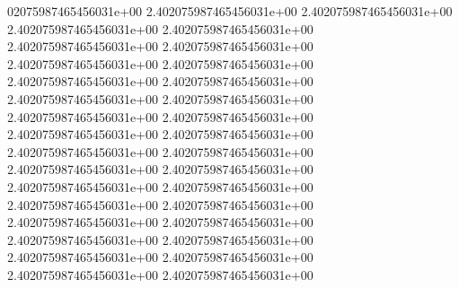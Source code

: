 02075987465456031e+00	2.402075987465456031e+00	2.402075987465456031e+00	2.402075987465456031e+00	2.402075987465456031e+00	2.402075987465456031e+00	2.402075987465456031e+00	2.402075987465456031e+00	2.402075987465456031e+00	2.402075987465456031e+00	2.402075987465456031e+00	2.402075987465456031e+00	2.402075987465456031e+00	2.402075987465456031e+00	2.402075987465456031e+00	2.402075987465456031e+00	2.402075987465456031e+00	2.402075987465456031e+00	2.402075987465456031e+00	2.402075987465456031e+00	2.402075987465456031e+00	2.402075987465456031e+00	2.402075987465456031e+00	2.402075987465456031e+00	2.402075987465456031e+00	2.402075987465456031e+00	2.402075987465456031e+00	2.402075987465456031e+00	2.402075987465456031e+00	2.402075987465456031e+00	2.402075987465456031e+00	2.402075987465456031e+00	2.402075987465456031e+00

